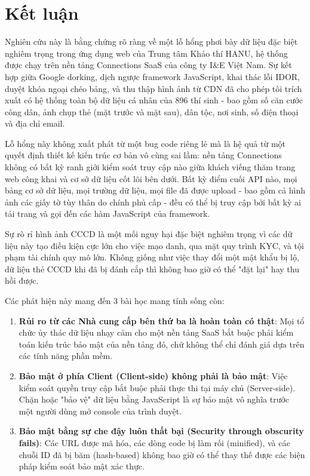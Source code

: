 \documentclass[12pt,a4paper]{article}
\begin{document}
\section{Kết luận}
\label{sec:conclusion}

Nghiên cứu này là bằng chứng rõ ràng về một lỗ hổng phơi bày dữ liệu đặc biệt nghiêm trọng trong ứng dụng web của Trung tâm Khảo thí HANU, hệ thống được chạy trên nền tảng Connections SaaS của công ty I\&E Việt Nam. Sự kết hợp giữa Google dorking, dịch ngược framework JavaScript, khai thác lỗi IDOR, duyệt khóa ngoại chéo bảng, và thu thập hình ảnh từ CDN đã cho phép tôi trích xuất có hệ thống toàn bộ dữ liệu cá nhân của 896 thí sinh - bao gồm số căn cước công dân, ảnh chụp thẻ (mặt trước và mặt sau), dân tộc, nơi sinh, số điện thoại và địa chỉ email.

Lỗ hổng này không xuất phát từ một bug code riêng lẻ mà là hệ quả từ một quyết định thiết kế kiến trúc cơ bản vô cùng sai lầm: nền tảng Connections không có bất kỳ ranh giới kiểm soát truy cập nào giữa khách viếng thăm trang web công khai và cơ sở dữ liệu cốt lõi bên dưới. Bất kỳ điểm cuối API nào, mọi bảng cơ sở dữ liệu, mọi trường dữ liệu, mọi file đã được upload - bao gồm cả hình ảnh các giấy tờ tùy thân do chính phủ cấp - đều có thể bị truy cập bởi bất kỳ ai tải trang và gọi đến các hàm JavaScript của framework. 

Sự rò rỉ hình ảnh CCCD là một mối nguy hại đặc biệt nghiêm trọng vì các dữ liệu này tạo điều kiện cực lớn cho việc mạo danh, qua mặt quy trình KYC, và tội phạm tài chính quy mô lớn. Không giống như việc thay đổi một mật khẩu bị lộ, dữ liệu thẻ CCCD khi đã bị đánh cắp thì không bao giờ có thể "đặt lại" hay thu hồi được.

Các phát hiện này mang đến 3 bài học mang tính sống còn:
\begin{enumerate}
    \item \textbf{Rủi ro từ các Nhà cung cấp bên thứ ba là hoàn toàn có thật}: Mọi tổ chức ủy thác dữ liệu nhạy cảm cho một nền tảng SaaS bắt buộc phải kiểm toán kiến trúc bảo mật của nền tảng đó, chứ không thể chỉ đánh giá dựa trên các tính năng phần mềm.
    \item \textbf{Bảo mật ở phía Client (Client-side) không phải là bảo mật}: Việc kiểm soát quyền truy cập bắt buộc phải thực thi tại máy chủ (Server-side). Chặn hoặc "bảo vệ" dữ liệu bằng JavaScript là sự bảo mật vô nghĩa trước một người dùng mở console của trình duyệt.
    \item \textbf{Bảo mật bằng sự che đậy luôn thất bại (Security through obscurity fails)}: Các URL được mã hóa, các dòng code bị làm rối (minified), và các chuỗi ID đã bị băm (hash-based) không bao giờ có thể thay thế được các biện pháp kiểm soát bảo mật xác thực.
\end{enumerate}
\end{document}
